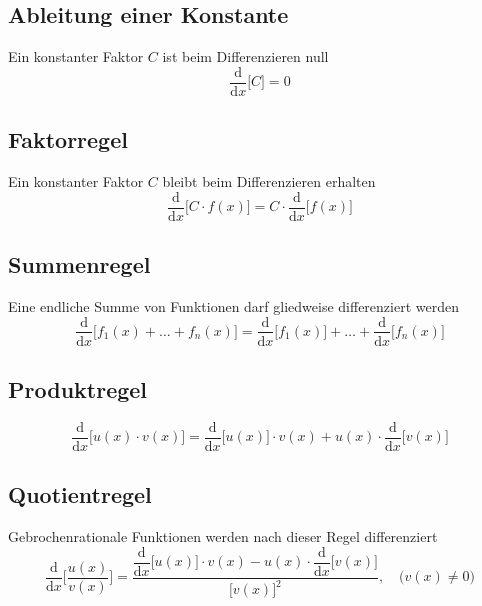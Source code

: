 \subsection{Ableitung einer Konstante}
Ein konstanter Faktor $C$ ist beim Differenzieren null
\begin{equation}
\boxed{\dfrac{\text{d}}{\text{d}x}\Big[C\Big]=0}
\end{equation}
\subsection{Faktorregel}
Ein konstanter Faktor $C$ bleibt beim Differenzieren erhalten
\begin{equation}
\boxed{\dfrac{\text{d}}{\text{d}x}\Big[C\cdot f\left(x\right)\Big]=C\cdot \dfrac{\text{d}}{\text{d}x}\Big[f\left(x\right)\Big]}
\end{equation}
\subsection{Summenregel}
Eine endliche Summe von Funktionen darf gliedweise differenziert werden
\begin{equation}
\boxed{\dfrac{\text{d}}{\text{d}x}\Big[f_1\left(x\right)+\dotso+f_n\left(x\right)\Big]=\dfrac{\text{d}}{\text{d}x}\Big[f_1\left(x\right)\Big]+\dotso+\dfrac{\text{d}}{\text{d}x}\Big[f_n\left(x\right)\Big]}
\end{equation}
\subsection{Produktregel}
\begin{equation}
\boxed{\dfrac{\text{d}}{\text{d}x}\Big[u\left(x\right)\cdot v\left(x\right)\Big]=\dfrac{\text{d}}{\text{d}x}\Big[u\left(x\right)\Big]\cdot v\left(x\right)+u\left(x\right)\cdot \dfrac{\text{d}}{\text{d}x}\Big[v\left(x\right)\Big]}
\end{equation}
\subsection{Quotientregel}
Gebrochenrationale Funktionen werden nach dieser Regel differenziert
\begin{equation}
\boxed{\dfrac{\text{d}}{\text{d}x}\Big[\dfrac{u\left(x\right)}{v\left(x\right)}\Big]=\dfrac{\dfrac{\text{d}}{\text{d}x}\Big[u\left(x\right)\Big]\cdot v\left(x\right)-u\left(x\right)\cdot \dfrac{\text{d}}{\text{d}x}\Big[v\left(x\right)\Big]}{\Big[v\left(x\right)\Big]^2},\quad \Big(v\left(x\right)\neq 0\Big)}
\end{equation}
